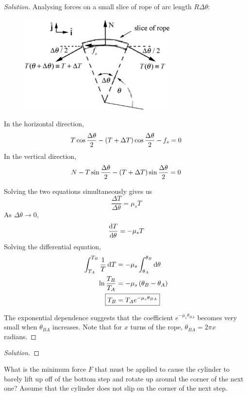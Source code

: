 \begin{proof}[Solution]
Analysing forces on a small slice of rope of arc length $R\Delta\theta$:

\begin{figure}[H]
    \centering
    \includegraphics[width=8cm]{images/Capstan_1.png}
\end{figure}

In the horizontal direction,
\[ T\cos\frac{\Delta\theta}{2} - \left(T+\Delta T\right)\cos\frac{\Delta\theta}{2} - f_s = 0 \]
In the vertical direction,
\[ N - T\sin\frac{\Delta\theta}{2} - \left(T+\Delta T\right)\sin\frac{\Delta\theta}{2} = 0 \]

Solving the two equations simultaneously gives us 
\[ \frac{\Delta T}{\Delta \theta} = \mu_s T \]
As $\Delta \theta \to 0$, 
\[ \dv{T}{\theta} = -\mu_s T \]
Solving the differential equation,
\begin{align*}
\int_{T_A}^{T_B} \frac{1}{T} \dd{T} 
&= -\mu_s \int_{\theta_A}^{\theta_B} \dd{\theta} \\
\ln \frac{T_B}{T_A} &= -\mu_s\brac{\theta_B-\theta_A} \\
\Aboxed{T_B &= T_A e^{-\mu_s \theta_{BA}}}
\end{align*}

The exponential dependence suggests that the coefficient $e^{-\mu_s \theta_{BA}}$ becomes very small when $\theta_{BA}$ increases. Note that for $x$ turns of the rope, $\theta_{BA}=2\pi x$ radians.
\end{proof}
\pagebreak

\begin{prbm}

\end{prbm}

\begin{proof}[Solution]

\end{proof}
\pagebreak

\begin{prbm}
What is the minimum force $F$ that must be applied to cause the cylinder to barely lift up off of the bottom step and rotate up around the corner of the next one? Assume that the cylinder does not slip on the corner of the next step.
\end{prbm}

